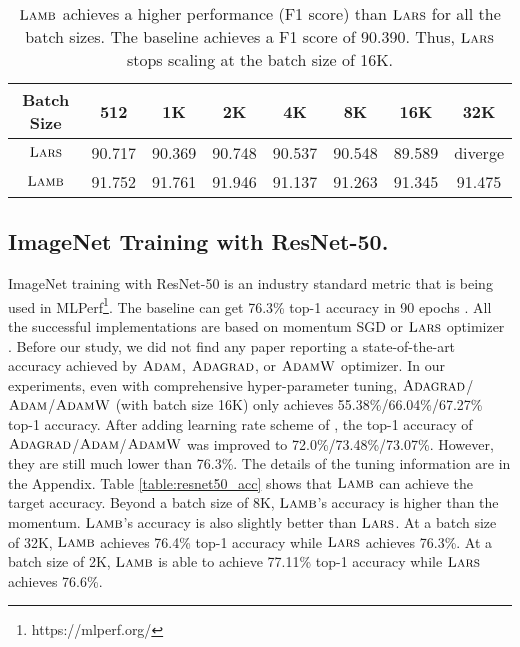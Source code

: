 \documentclass{article} \usepackage{iclr2020_conference,times}
\newcommand{\adagrad}{\textsc{Adagrad}}
\newcommand{\adam}{\textsc{Adam}}
\newcommand{\adamw}{\textsc{AdamW}}
\newcommand{\lamb}{\textsc{Lamb}}
\newcommand{\lars}{\textsc{Lars}}
\begin{document}
\begin{table}[ht]
\renewcommand{\arraystretch}{1.3}
\caption{ $\lamb$ achieves a higher performance (F1 score) than $\lars$ for all the batch sizes. The baseline achieves a F1 score of 90.390. Thus, $\lars$ stops scaling at the batch size of 16K.}
\centering

\begin{tabular}{|c|c|c|c|c|c|c|c|}
\hline
Batch Size & 512 & 1K & 2K & 4K & 8K & 16K & 32K\\
\hline
\hline
$\lars$ & 90.717 & 90.369 & 90.748 & 90.537 & 90.548 & 89.589 & diverge \\
\hline
$\lamb$ & 91.752 & 91.761 & 91.946 & 91.137 & 91.263 & 91.345 & 91.475 \\
\hline
\end{tabular}
\label{table:lars_lamb_bert}
\end{table}

\subsection{ImageNet Training with ResNet-50.}
ImageNet training with ResNet-50 is an industry standard metric that is being used in MLPerf\footnote{https://mlperf.org/}. 
The baseline can get 76.3\% top-1 accuracy in 90 epochs \citep{goyal2017accurate}.
All the successful implementations are based on momentum SGD \citep{he2016deep, goyal2017accurate} or $\lars$ optimizer \citep{ying2018image, jia2018highly, mikami2018imagenet, you2018imagenet,yamazaki2019yet}.
Before our study, we did not find any paper reporting a state-of-the-art accuracy achieved by $\adam$, $\adagrad$, or $\adamw$ optimizer.
In our experiments, even with comprehensive hyper-parameter tuning, $\adagrad$/$\adam$/$\adamw$ (with batch size 16K) only achieves 55.38\%/66.04\%/67.27\% top-1 accuracy.
After adding learning rate scheme of \cite{goyal2017accurate},
the top-1 accuracy of $\adagrad$/$\adam$/$\adamw$ was improved to 72.0\%/73.48\%/73.07\%.
However, they are still much lower than 76.3\%.
The details of the tuning information are in the Appendix.
Table \ref{table:resnet50_acc} shows that $\lamb$ can achieve the target accuracy.
Beyond a batch size of 8K, $\lamb$'s accuracy is higher than the momentum.
$\lamb$'s accuracy is also slightly better than $\lars$.
At a batch size of 32K, $\lamb$ achieves 76.4\% top-1 accuracy while $\lars$ achieves 76.3\%.
At a batch size of 2K, $\lamb$ is able to achieve 77.11\% top-1 accuracy while $\lars$ achieves 76.6\%.
\end{document}
